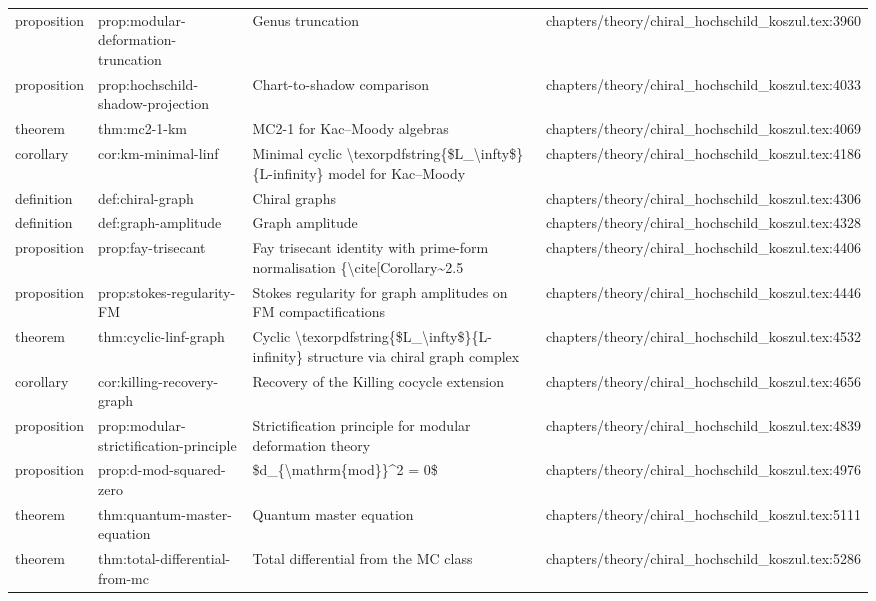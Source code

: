 \documentclass[11pt]{article}
\begin{document}
\begin{longtable}{L{0.10\textwidth}L{0.26\textwidth}L{0.42\textwidth}L{0.22\textwidth}}
proposition & prop:modular-deformation-truncation & Genus truncation & chapters/theory/chiral\_hochschild\_koszul.tex:3960\\
proposition & prop:hochschild-shadow-projection & Chart-to-shadow comparison & chapters/theory/chiral\_hochschild\_koszul.tex:4033\\
theorem & thm:mc2-1-km & MC2-1 for Kac--Moody algebras & chapters/theory/chiral\_hochschild\_koszul.tex:4069\\
corollary & cor:km-minimal-linf & Minimal cyclic \textbackslash{}texorpdfstring\{\$L\_\textbackslash{}infty\$\}\{L-infinity\} model for Kac--Moody & chapters/theory/chiral\_hochschild\_koszul.tex:4186\\
definition & def:chiral-graph & Chiral graphs & chapters/theory/chiral\_hochschild\_koszul.tex:4306\\
definition & def:graph-amplitude & Graph amplitude & chapters/theory/chiral\_hochschild\_koszul.tex:4328\\
proposition & prop:fay-trisecant & Fay trisecant identity with prime-form normalisation \{\textbackslash{}cite[Corollary\textasciitilde{}2.5 & chapters/theory/chiral\_hochschild\_koszul.tex:4406\\
proposition & prop:stokes-regularity-FM & Stokes regularity for graph amplitudes on FM compactifications & chapters/theory/chiral\_hochschild\_koszul.tex:4446\\
theorem & thm:cyclic-linf-graph & Cyclic \textbackslash{}texorpdfstring\{\$L\_\textbackslash{}infty\$\}\{L-infinity\} structure via chiral graph complex & chapters/theory/chiral\_hochschild\_koszul.tex:4532\\
corollary & cor:killing-recovery-graph & Recovery of the Killing cocycle extension & chapters/theory/chiral\_hochschild\_koszul.tex:4656\\
proposition & prop:modular-strictification-principle & Strictification principle for modular deformation theory & chapters/theory/chiral\_hochschild\_koszul.tex:4839\\
proposition & prop:d-mod-squared-zero & \$d\_\{\textbackslash{}mathrm\{mod\}\}\textasciicircum{}2 = 0\$ & chapters/theory/chiral\_hochschild\_koszul.tex:4976\\
theorem & thm:quantum-master-equation & Quantum master equation & chapters/theory/chiral\_hochschild\_koszul.tex:5111\\
theorem & thm:total-differential-from-mc & Total differential from the MC class & chapters/theory/chiral\_hochschild\_koszul.tex:5286\\

\end{longtable}
\end{document}
